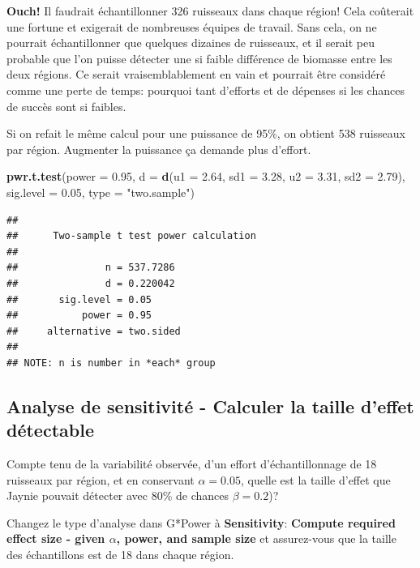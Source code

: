 \documentclass[
  12pt,
]{book}
\makeatletter
\newenvironment{Shaded}{\begin{snugshade}}{\end{snugshade}}
\newcommand{\DataTypeTok}[1]{\textcolor[rgb]{0.13,0.29,0.53}{#1}}
\newcommand{\FloatTok}[1]{\textcolor[rgb]{0.00,0.00,0.81}{#1}}
\newcommand{\KeywordTok}[1]{\textcolor[rgb]{0.13,0.29,0.53}{\textbf{#1}}}
\newcommand{\NormalTok}[1]{#1}
\newcommand{\StringTok}[1]{\textcolor[rgb]{0.31,0.60,0.02}{#1}}
\newenvironment{kframe}{%
\medskip{}
\setlength{\fboxsep}{.8em}
\def\at@end@of@kframe{}%
\ifinner\ifhmode%
 \def\at@end@of@kframe{\end{minipage}}%
 \begin{minipage}{\columnwidth}%
\fi\fi%
\def\FrameCommand##1{\hskip\@totalleftmargin \hskip-\fboxsep
\colorbox{incolor}{##1}\hskip-\fboxsep
    \hskip-\linewidth \hskip-\@totalleftmargin \hskip\columnwidth}%
\MakeFramed {\advance\hsize-\width
  \@totalleftmargin\z@ \linewidth\hsize
  \@setminipage}}%
{\par\unskip\endMakeFramed%
\at@end@of@kframe}
\newenvironment{rmdblock}[1]
 {
 \begin{itemize}
 \renewcommand{\labelitemi}{
   \raisebox{-.7\height}[0pt][0pt]{
     {\setkeys{Gin}{width=3em,keepaspectratio}\texttt{[image: images/\#1]}}
   }
 }
 \begin{kframe}
 \setlength{\fboxsep}{1em}
 \item
 }
 {
 \end{kframe}
 \end{itemize}
 }
\newenvironment{rmdcode}
  {\begin{rmdblock}{screen}}
  {\end{rmdblock}}
\makeatother
\begin{document}
\textbf{Ouch!} Il faudrait échantillonner 326 ruisseaux dans chaque région! Cela coûterait une fortune et exigerait de nombreuses équipes de travail.
Sans cela, on ne pourrait échantillonner que quelques dizaines de ruisseaux, et il serait peu probable que l'on puisse détecter une si faible différence de biomasse entre les deux régions.
Ce serait vraisemblablement en vain et pourrait être considéré comme une perte de temps: pourquoi tant d'efforts et de dépenses si les chances de succès sont si faibles.

Si on refait le même calcul pour une puissance de 95\%, on obtient 538 ruisseaux par région.
Augmenter la puissance ça demande plus d'effort.

\begin{Shaded}
\begin{Highlighting}[]
\KeywordTok{pwr.t.test}\NormalTok{(}\DataTypeTok{power =} \FloatTok{0.95}\NormalTok{, }\DataTypeTok{d =} \KeywordTok{d}\NormalTok{(}\DataTypeTok{u1 =} \FloatTok{2.64}\NormalTok{, }\DataTypeTok{sd1 =} \FloatTok{3.28}\NormalTok{, }\DataTypeTok{u2 =} \FloatTok{3.31}\NormalTok{, }\DataTypeTok{sd2 =} \FloatTok{2.79}\NormalTok{), }\DataTypeTok{sig.level =} \FloatTok{0.05}\NormalTok{, }\DataTypeTok{type =} \StringTok{"two.sample"}\NormalTok{)}
\end{Highlighting}
\end{Shaded}

\begin{verbatim}
## 
##      Two-sample t test power calculation 
## 
##               n = 537.7286
##               d = 0.220042
##       sig.level = 0.05
##           power = 0.95
##     alternative = two.sided
## 
## NOTE: n is number in *each* group
\end{verbatim}

\hypertarget{analyse-de-sensitivituxe9---calculer-la-taille-deffet-duxe9tectable}{%
\subsection{Analyse de sensitivité - Calculer la taille d'effet détectable}\label{analyse-de-sensitivituxe9---calculer-la-taille-deffet-duxe9tectable}}

Compte tenu de la variabilité observée, d'un effort d'échantillonnage de 18 ruisseaux par région, et en conservant \(\alpha=0.05\), quelle est la taille d'effet que Jaynie pouvait détecter avec 80\% de chances \(\beta=0.2\))?

\begin{rmdcode}
Changez le type d'analyse dans G*Power à \textbf{Sensitivity}: \textbf{Compute required effect size - given \(\alpha\), power, and sample size} et assurez-vous que la taille des échantillons est de 18 dans chaque région.
\end{rmdcode}
\end{document}
